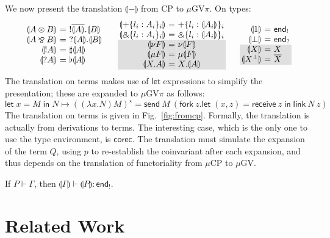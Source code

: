 \documentclass[orivec,envcountsame]{llncs}
\makeatletter
\newcommand{\with}{\mathbin\binampersand}
\newcommand{\parr}{\mathbin\bindnasrepma}
\newcommand{\cpdual}[1]{#1^\perp}
\newcommand{\cpbang}[1]{{! #1}}
\newcommand{\cpquery}[1]{{? #1}}
\newcommand{\gvdual}[1]{\overline{#1}}
\newcommand{\gvout}[2]{{!#1.#2}}
\newcommand{\gvin}[2]{{?#1.#2}}
\newcommand{\outterm}{\mkwd{end}_!}
\newcommand{\interm}{\mkwd{end}_?}
\newcommand{\gvserver}[1]{\flat #1}
\newcommand{\gvservice}[1]{\sharp #1}
\newcommand{\cptyp}[2]{#1 \vdash #2}
\newcommand{\gvtyp}[3]{#1 \vdash #2 : #3}
\newcommand{\mkwd}[1]{\mathsf{#1}}
\newcommand{\gvsend}[2]{\mkwd{send}\:#1\:#2}
\newcommand{\gvreceive}[1]{\mkwd{receive}\:#1}
\newcommand{\gvlet}[3]{\mkwd{let}\;#1 = #2\;\mkwd{in}\;#3}
\newcommand{\gvlink}[2]{\mkwd{link}\:#1\:#2}
\newcommand{\gvfork}[2]{\mkwd{fork}\:#1.#2}
\newcommand{\gvreceivek}[4]{\gvlet{({#1}, {#2})}{\gvreceive{#3}}{#4}}
\newcommand{\key}{\mkwd}
\newcommand{\togv}[1]{\llparenthesis #1 \rrparenthesis}
\newcommand{\topi}[1]{({#1})^\star}
\newcommand{\mucp}{$\mu\mathrm{CP}$\xspace}
\newcommand{\mugv}{$\mu\mathrm{GV}$\xspace}
\newcommand{\gvpi}{$\mu\mathrm{GV}\pi$\xspace}
\newcommand{\ba}{\begin{array}}
\newcommand{\ea}{\end{array}}
\newenvironment{eqs}{\ba{@{}r@{~}c@{~}l@{}}}{\ea}
\newcommand\shaderow{\noalign{\vskip-0.4pt}\rowcolor{shade}[0.6mm]}
\makeatother
\begin{document}
We now present the translation $\togv{-}$ from CP to \gvpi. On types:
\small\[
\ba{@{}c@{\qquad}c@{\qquad}c@{}}
\begin{eqs}
\togv{A \otimes B} &=& \gvout{\gvdual{\togv{A}}}{\togv{B}} \\
\togv{A \parr B}   &=& \gvin{\togv{A}}{\togv{B}} \\
\togv{\cpbang{A}}   &=& \gvservice{\togv{A}} \\
\togv{\cpquery{A}}  &=& \gvserver{\togv{A}} \\
\end{eqs}
&
\begin{eqs}
\togv{+\{l_i:A_i\}_i}     &=& +\{l_i:\togv{A_i}\}_i  \\
\togv{\with\{l_i:A_i\}_i} &=& \with\{l_i:\togv{A_i}\}_i \\ \shaderow
\togv{\nu F} &=& \nu \togv{F} \\ \shaderow
\togv{\mu F} &=& \mu \togv{F} \\ \shaderow
\togv{X.A} &=& X.\togv{A} \\
\end{eqs}
&
\begin{eqs}
\togv{1}           &=& \outterm \\
\togv{\bot}        &=& \interm \\ \shaderow
\togv{X}           &=& X \\ \shaderow
\togv{\cpdual{X}}  &=& \gvdual{X} \\
\end{eqs}
\ea
\]\normalsize
The translation on terms makes use of $\key{let}$ expressions to simplify the presentation; these
are expanded to \gvpi as follows:
\small\[
\gvlet{x}{M}{N} \mapsto
  \topi{(\lambda x.N) M} =
  \gvsend{M}{(\gvfork{z}{\gvreceivek{x}{z}{z}{\gvlink{N}{z}}})}
\]\normalsize%
The translation on terms is given in Fig.~\ref{fig:fromcp}. Formally, the translation is actually
from derivations to terms. The interesting case, which is the only one to use the type environment,
is $\key{corec}$. The translation must simulate the expansion of the term $Q$, using $p$ to
re-establish the coinvariant after each expansion, and thus depends on the translation of
functoriality from \mucp to \mugv.

\begin{theorem}
  If $\cptyp{P}{\Gamma}$, then $\gvtyp{\togv{\Gamma}}{\togv{P}}{\outterm}$.
\end{theorem}

\section{Related Work}\label{sec:related}
\end{document}

